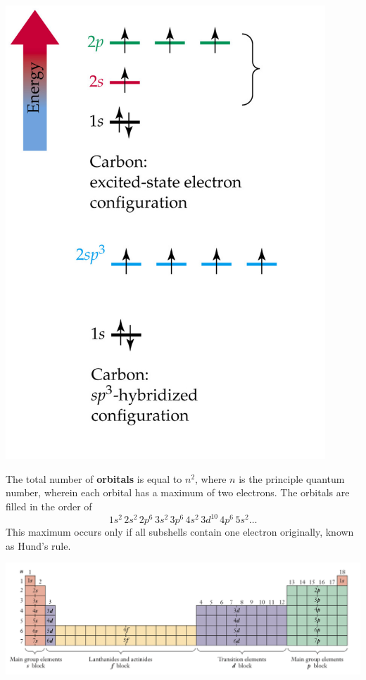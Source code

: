 \documentclass{tufte-book}
\renewcommand{\emph}[1]{\textbf{#1}}
\begin{document}
\begin{marginfigure}[3cm]
\begin{center}
  \includegraphics[width=0.9\textwidth]{orbitals} \phantom{mmm}
\end{center}
\end{marginfigure}
%
The total number of \emph{orbitals} is equal to $n^2$, where $n$ is the principle quantum number, wherein each orbital has a maximum of two electrons. The orbitals are filled in the order of \begin{equation}
  1s^2 \, 2s^2 \, 2p^6 \, 3s^2 \, 3p^6 \, 4s^2 \, 3d^{10} \, 4p^6 \, 5s^2 \dots
\end{equation}
This maximum occurs only if all subshells contain one electron originally, known as Hund's rule.

\begin{center}
  \includegraphics[width=\textwidth]{table}
\end{center}
\end{document}
